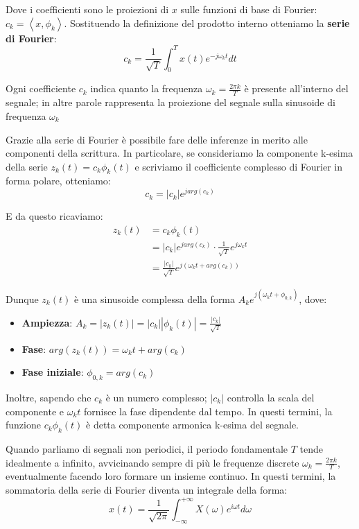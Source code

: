 \noindent Dove i coefficienti sono le proiezioni di $x$ sulle funzioni di base di Fourier: $c_k = \left<x, \phi_k \right>$. Sostituendo la definizione
del prodotto interno otteniamo la \textbf{serie di Fourier}: \[
    c_k = \frac{1}{\sqrt{T}} \int_0^T x(t)e^{-j\omega_k t} dt
\]

\noindent Ogni coefficiente $c_k$ indica quanto la frequenza $\omega_k = \frac{2\pi k}{T}$ è presente all'interno del segnale; in altre parole
rappresenta la proiezione del segnale sulla sinusoide di frequenza $\omega_k$\par
Grazie alla serie di Fourier è possibile fare delle inferenze in merito alle componenti della scrittura. In particolare, se consideriamo la componente
k-esima della serie $z_k(t) = c_k\phi_k(t)$ e scriviamo il coefficiente complesso di Fourier in forma polare, otteniamo: \[
    c_k = |c_k|e^{jarg(c_k)}
\]

\noindent E da questo ricaviamo: \begin{equation}
    \begin{split}
        z_k(t) &= c_k\phi_k(t)\\
            &= |c_k|e^{jarg(c_k)}\cdot \frac{1}{\sqrt{T}}e^{j\omega_k t}\\
            &= \frac{|c_k|}{\sqrt{T}}e^{j(\omega_kt + arg(c_k))}
    \end{split}
\end{equation}

\noindent Dunque $z_k(t)$ è una sinusoide complessa della forma $A_ke^{j(\omega_kt + \phi_{0,k})}$, dove: \begin{itemize}
    \item \textbf{Ampiezza}: $A_k = |z_k(t)| = |c_k||\phi_k(t)| = \frac{|c_k|}{\sqrt{T}}$
    \item \textbf{Fase}: $arg(z_k(t)) = \omega_kt + arg(c_k)$
    \item \textbf{Fase iniziale}: $\phi_{0,k} = arg(c_k)$
\end{itemize}

\noindent Inoltre, sapendo che $c_k$ è un numero complesso; $|c_k|$ controlla la scala del componente e $\omega_kt$ fornisce la fase dipendente dal
tempo. In questi termini, la funzione $c_k\phi_k(t)$ è detta componente armonica k-esima del segnale.\par
Quando parliamo di segnali non periodici, il periodo fondamentale $T$ tende idealmente a infinito, avvicinando sempre di più le frequenze discrete
$\omega_k = \frac{2\pi k}{T}$, eventualmente facendo loro formare un insieme continuo. In questi termini, la sommatoria della serie di Fourier diventa
un integrale della forma: \[
    x(t) = \frac{1}{\sqrt{2\pi}}\int_{-\infty}^{+\infty} X(\omega)e^{i\omega t}d\omega
\]

